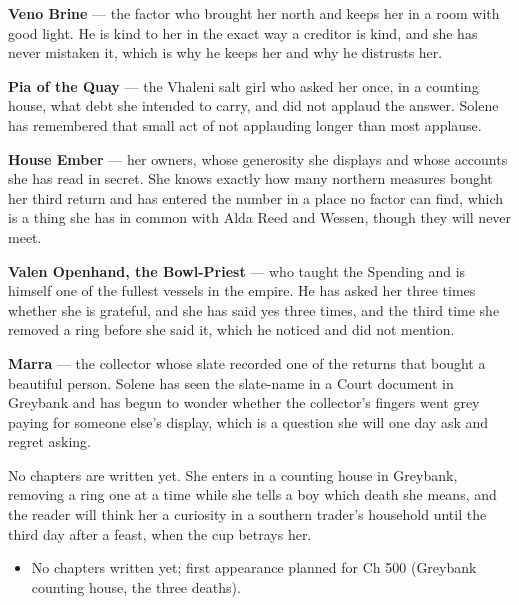 \documentclass{design/chronicle}
\begin{document}
{\textbf{Veno Brine} — the factor who brought her north and keeps her in a room with good light. He is kind to her in the exact way a creditor is kind, and she has never mistaken it, which is why he keeps her and why he distrusts her.

\textbf{Pia of the Quay} — the Vhaleni salt girl who asked her once, in a counting house, what debt she intended to carry, and did not applaud the answer. Solene has remembered that small act of not applauding longer than most applause.

\textbf{House Ember} — her owners, whose generosity she displays and whose accounts she has read in secret. She knows exactly how many northern measures bought her third return and has entered the number in a place no factor can find, which is a thing she has in common with Alda Reed and Wessen, though they will never meet.

\textbf{Valen Openhand, the Bowl-Priest} — who taught the Spending and is himself one of the fullest vessels in the empire. He has asked her three times whether she is grateful, and she has said yes three times, and the third time she removed a ring before she said it, which he noticed and did not mention.

\textbf{Marra} — the collector whose slate recorded one of the returns that bought a beautiful person. Solene has seen the slate-name in a Court document in Greybank and has begun to wonder whether the collector’s fingers went grey paying for someone else’s display, which is a question she will one day ask and regret asking.

No chapters are written yet. She enters in a counting house in Greybank, removing a ring one at a time while she tells a boy which death she means, and the reader will think her a curiosity in a southern trader’s household until the third day after a feast, when the cup betrays her.

\begin{itemize}[leftmargin=1.4em,itemsep=1pt,topsep=3pt,parsep=0pt]

\item No chapters written yet; first appearance planned for Ch 500 (Greybank counting house, the three deaths).

\end{itemize}
}
\end{document}
